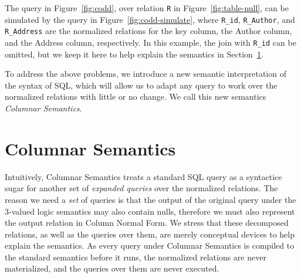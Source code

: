 \documentclass[sigconf,nonacm]{acmart}
\begin{document}
\begin{example}
\label{ex:cnf-query}  
The query in Figure~\ref{fig:codd},
 over relation \lstinline|R| in Figure~\ref{fig:table-null},
 can be simulated by the query in Figure~\ref{fig:codd-simulate},
 where \lstinline|R_id|, \lstinline|R_Author|, and \lstinline|R_Address|
 are the normalized relations for the key column, 
 the \textsf{Author} column, and the \textsf{Address} column, respectively.
In this example, the join with \lstinline|R_id| can be omitted, 
 but we keep it here to help explain the semantics in Section~\ref{sec:cs}.
\end{example}
To address the above problems, 
 we introduce a new semantic interpretation of the syntax of SQL,
 which will allow us to adapt any query to work over 
 the normalized relations with little or no change.
We call this new semantics {\em Columnar Semantics}.

\section{Columnar Semantics}
\label{sec:cs}

Intuitively, Columnar Semantics treats a standard SQL query 
 as a syntactice sugar for another set of {\em expanded queries}
 over the normalized relations.
The reason we need a {\em set} of queries is that
 the output of the original query under the 3-valued logic semantics may 
 also contain nulls, 
 therefore we must also represent the output relation in Column Normal Form. 
We stress that these decomposed relations,
 as well as the queries over them,
 are merely conceptual devices to help explain the semantics.
As every query under Columnar Semantics 
 is compiled to the standard semantics before it runs,
 the normalized relations are never materialized,
 and the queries over them are never executed.
\end{document}
